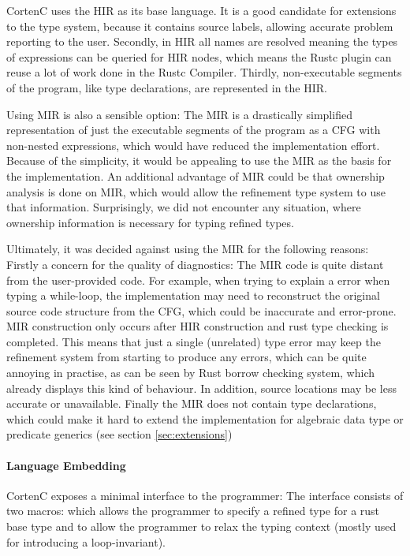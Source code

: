 \documentclass[twoside, english]{sdqthesis}
\theoremstyle{definition}
\begin{document}
CortenC uses the HIR as its base language. It is a good candidate for extensions to the type system, because it contains source labels, allowing accurate problem reporting to the user. Secondly, in HIR all names are resolved meaning the types of expressions can be queried for HIR nodes, which means the Rustc plugin can reuse a lot of work done in the Rustc Compiler. Thirdly, non-executable segments of the program, like type declarations, are represented in the HIR.

Using MIR is also a sensible option: The MIR is a drastically simplified representation of just the executable segments of the program as a CFG with non-nested expressions, which would have reduced the implementation effort.
Because of the simplicity, it would be appealing to use the MIR as the basis for the implementation. 
An additional advantage of MIR could be that ownership analysis is done on MIR, which would allow the refinement type system to use that information. Surprisingly, we did not encounter any situation, where ownership information is necessary for typing refined types.

Ultimately, it was decided against using the MIR for the following reasons:
Firstly a concern for the quality of diagnostics: The MIR code is quite distant from the user-provided code. For example, when trying to explain a error when typing a while-loop, the implementation may need to reconstruct the original source code structure from the CFG, which could be inaccurate and error-prone. 
MIR construction only occurs after HIR construction and rust type checking is completed. This means that just a single (unrelated) type error may keep the refinement system from starting to produce any errors, which can be quite annoying in practise, as can be seen by Rust borrow checking system, which already displays this kind of behaviour.
In addition, source locations may be less accurate or unavailable. 
Finally the MIR does not contain type declarations, which could make it hard to extend the implementation for algebraic data type or predicate generics (see section \ref{sec:extensions})

\paragraph{Language Embedding}
CortenC exposes a minimal interface to the programmer: The interface consists of two macros:
 which allows the programmer to specify a refined type for a rust base type and
 to allow the programmer to relax the typing context (mostly used for introducing a loop-invariant). 
\end{document}
